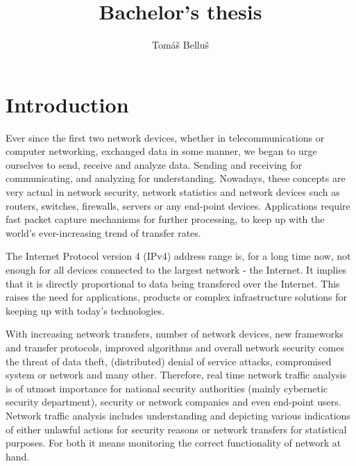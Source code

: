 \documentclass[12pt,a4paper,twoside]{report}
\title{Bachelor's thesis}
\author{Tomáš Belluš}
\begin{document}


\thispagestyle{empty}



\newpage{}\thispagestyle{empty}

\newpage
\thispagestyle{empty}
\mbox{}
\newpage



%


\begingroup
\color{black}
\tableofcontents
\endgroup

\chapter{Introduction}
	Ever since the first two network devices, whether in telecommunications or computer networking, exchanged data in some manner, we began to urge ourselves to send, receive and analyze data. Sending and receiving for communicating, and analyzing for understanding. Nowadays, these concepts are very actual in network security, network statistics and network devices such as routers, switches, firewalls, servers or any end-point devices. Applications require fast packet capture mechanisms for further processing, to keep up with the world's ever-increasing trend of transfer rates.\par
	The Internet Protocol version 4 (IPv4) address range is, for a long time now, not enough for all devices connected to the largest network - the Internet. It implies that it is directly proportional to data being transfered over the Internet. This raises the need for applications, products or complex infrastructure solutions for keeping up with today's technologies. \par
	With increasing network transfers, number of network devices, new frameworks and transfer protocols, improved algorithms and overall network security comes the threat of data theft, (distributed) denial of service attacks, compromised system or network and many other. Therefore, real time network traffic analysis is of utmost importance for national security authorities (mainly cybernetic security department), security or network companies and even end-point users. Network traffic analysis includes understanding and depicting various indications of either unlawful actions for security reasons or network transfers for statistical purposes. For both it means monitoring the correct functionality of network at hand.\par
\end{document}
